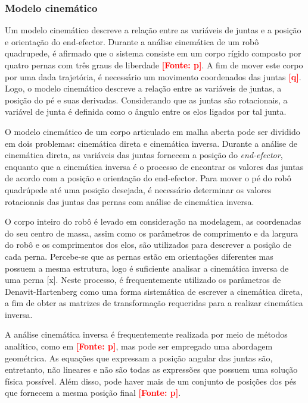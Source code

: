 \documentclass[../main.tex]{subfiles}
\begin{document}
  \subsubsection{Modelo cinemático}
  Um modelo cinemático descreve a relação entre as variáveis de juntas e a posição e orientação do end-efector. Durante a análise cinemática de um robô quadrupede, é afirmado que o sistema consiste em um corpo rígido composto por quatro pernas com três graus de liberdade \textbf{\textcolor{red}{[Fonte: p]}}. A fim de mover este corpo por uma dada trajetória, é necessário um movimento coordenados das juntas \textbf{\textcolor{red}{[q]}}. Logo, o modelo cinemático descreve a relação entre as variáveis de juntas, a posição do pé e suas derivadas. Considerando que as juntas são rotacionais, a variável de junta é definida como o ângulo entre os elos ligados por tal junta.

  O modelo cinemático de um corpo articulado em malha aberta pode ser dividido em dois problemas: cinemática direta e cinemática inversa. Durante a análise de cinemática direta, as variáveis das juntas fornecem a posição do \textit{end-efector}, enquanto que a cinemática inversa é o processo de encontrar os valores das juntas de acordo com a posição e orientação do end-efector. Para mover o pé do robô quadrúpede até uma posição desejada, é necessário determinar os valores rotacionais das juntas das pernas com análise de cinemática inversa.

  O corpo inteiro do robô é levado em consideração na modelagem, as coordenadas do seu centro de massa, assim como os parâmetros de comprimento e da largura do robô e os comprimentos dos elos, são utilizados para descrever a posição de cada perna. Percebe-se que as pernas estão em orientações diferentes mas possuem a mesma estrutura, logo é suficiente analisar a cinemática inversa de uma perna [x]. Neste processo, é frequentemente utilizado os parâmetros de Denavit-Hartenberg como uma forma sistemática  de escrever a cinemática direta, a fim de obter as matrizes de transformação requeridas para a realizar cinemática inversa.

  A análise cinemática inversa é frequentemente realizada por meio de métodos analítico, como em \textbf{\textcolor{red}{[Fonte: p]}}, mas pode ser empregado uma abordagem geométrica. As equações que expressam a posição angular das juntas são, entretanto, não lineares e não são todas as expressões que possuem uma solução física possível.  Além disso, pode haver mais de um conjunto de posições dos pés que fornecem a mesma posição final \textbf{\textcolor{red}{[Fonte: p]}}.
\end{document}
